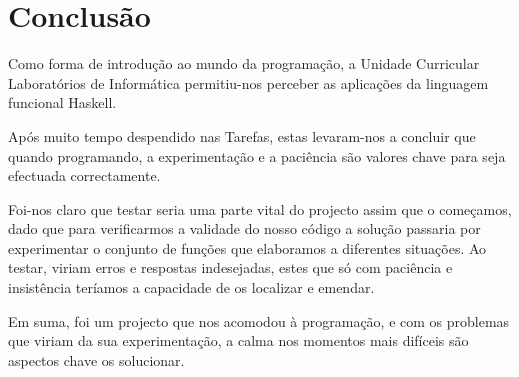 \documentclass[a4paper]{article}
\begin{document}
\section{Conclusão}

Como forma de introdução ao mundo da programação, a Unidade Curricular Laboratórios de Informática permitiu-nos perceber as aplicações da linguagem funcional Haskell.


Após muito tempo despendido nas Tarefas, estas levaram-nos a concluir que quando programando, a experimentação e a paciência são valores chave para seja efectuada correctamente.


Foi-nos claro que testar seria uma parte vital do projecto assim que o começamos, dado que para verificarmos a validade do nosso código a solução passaria por experimentar o conjunto de funções que elaboramos a diferentes situações. Ao testar, viriam erros e respostas indesejadas, estes que só com paciência e insistência teríamos a capacidade de os localizar e emendar.


Em suma, foi um projecto que nos acomodou à programação, e com os problemas que viriam da sua experimentação, a calma nos momentos mais difíceis são aspectos chave os solucionar.
\end{document}
